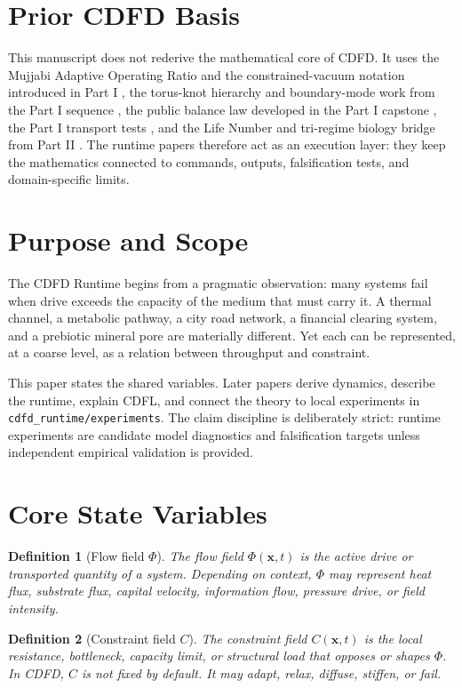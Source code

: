 \documentclass[12pt,a4paper]{article}
\newtheorem{definition}{Definition}
\begin{document}
\section{Prior CDFD Basis}
This manuscript does not rederive the mathematical core of CDFD. It uses the
Mujjabi Adaptive Operating Ratio and the constrained-vacuum notation introduced
in Part I \cite{MujjabiI2026}, the torus-knot hierarchy and boundary-mode work
from the Part I sequence \cite{MujjabiVI2026,MujjabiIX2026}, the public balance
law developed in the Part I capstone \cite{MujjabiX2026}, the Part I transport
tests \cite{MujjabiXII2026}, and the Life Number and tri-regime biology bridge
from Part II \cite{MujjabiPartII2026}. The runtime papers therefore act as an
execution layer: they keep the mathematics connected to commands, outputs,
falsification tests, and domain-specific limits.


\section{Purpose and Scope}
The CDFD Runtime begins from a pragmatic observation: many systems fail when
drive exceeds the capacity of the medium that must carry it. A thermal channel,
a metabolic pathway, a city road network, a financial clearing system, and a
prebiotic mineral pore are materially different. Yet each can be represented,
at a coarse level, as a relation between throughput and constraint.

This paper states the shared variables. Later papers derive dynamics, describe
the runtime, explain CDFL, and connect the theory to local experiments in
\texttt{cdfd\_runtime/experiments}. The claim discipline is deliberately strict:
runtime experiments are candidate model diagnostics and falsification targets
unless independent empirical validation is provided.

\section{Core State Variables}
\begin{definition}[Flow field $\Phi$]
The flow field $\Phi(\bm{x},t)$ is the active drive or transported quantity of a
system. Depending on context, $\Phi$ may represent heat flux, substrate flux,
capital velocity, information flow, pressure drive, or field intensity.
\end{definition}

\begin{definition}[Constraint field $C$]
The constraint field $C(\bm{x},t)$ is the local resistance, bottleneck,
capacity limit, or structural load that opposes or shapes $\Phi$. In CDFD,
$C$ is not fixed by default. It may adapt, relax, diffuse, stiffen, or fail.
\end{definition}
\end{document}
